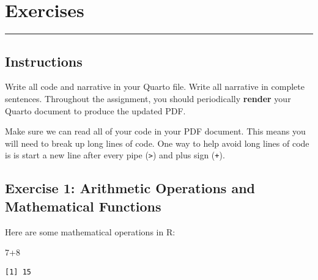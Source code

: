 \documentclass[
  letterpaper,
  DIV=11,
  numbers=noendperiod]{scrartcl}
\newenvironment{Shaded}{\begin{snugshade}}{\end{snugshade}}
\newcommand{\DecValTok}[1]{\textcolor[rgb]{0.68,0.00,0.00}{#1}}
\newcommand{\SpecialCharTok}[1]{\textcolor[rgb]{0.37,0.37,0.37}{#1}}
\begin{document}
\section{Exercises}\label{exercises}

\begin{center}\rule{0.5\linewidth}{0.5pt}\end{center}

\subsection{Instructions}\label{instructions}

Write all code and narrative in your Quarto file. Write all narrative in
complete sentences. Throughout the assignment, you should periodically
\textbf{render} your Quarto document to produce the updated PDF.

\begin{tcolorbox}[enhanced jigsaw, leftrule=.75mm, colback=white, toptitle=1mm, bottomtitle=1mm, colbacktitle=quarto-callout-tip-color!10!white, titlerule=0mm, bottomrule=.15mm, breakable, rightrule=.15mm, left=2mm, title=\textcolor{quarto-callout-tip-color}{\faLightbulb}\hspace{0.5em}{Tip}, toprule=.15mm, opacityback=0, opacitybacktitle=0.6, arc=.35mm, coltitle=black, colframe=quarto-callout-tip-color-frame]

Make sure we can read all of your code in your PDF document. This means
you will need to break up long lines of code. One way to help avoid long
lines of code is is start a new line after every pipe
(\texttt{\textbar{}\textgreater{}}) and plus sign (\texttt{+}).

\end{tcolorbox}

\subsection{Exercise 1: Arithmetic Operations and Mathematical
Functions}\label{exercise-1-arithmetic-operations-and-mathematical-functions}

Here are some mathematical operations in R:

\begin{Shaded}
\begin{Highlighting}[]
\DecValTok{7}\SpecialCharTok{+}\DecValTok{8}
\end{Highlighting}
\end{Shaded}

\begin{verbatim}
[1] 15
\end{verbatim}
\end{document}
